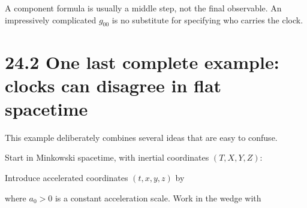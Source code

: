 \documentclass[
  11pt,
  letterpaper,
  oneside,
  openany]{scrbook}
\begin{document}
\endgroup

A component formula is usually a middle step, not the final observable.
An impressively complicated \(g_{00}\) is no substitute for specifying
who carries the clock.

\hypertarget{one-last-complete-example-clocks-can-disagree-in-flat-spacetime}{%
\section{24.2 One last complete example: clocks can disagree in flat
spacetime}\label{one-last-complete-example-clocks-can-disagree-in-flat-spacetime}}

This example deliberately combines several ideas that are easy to
confuse.

Start in Minkowski spacetime, with inertial coordinates \((T,X,Y,Z)\):

\begin{center}
\begingroup
{}
\ifdim\wd\grmathbox>\linewidth
\resizebox{\linewidth}{!}{\usebox{\grmathbox}}
\else\usebox{\grmathbox}\fi
\endgroup
\end{center}

Introduce accelerated coordinates \((t,x,y,z)\) by

\begin{center}
\begingroup
{}
\ifdim\wd\grmathbox>\linewidth
\resizebox{\linewidth}{!}{\usebox{\grmathbox}}
\else\usebox{\grmathbox}\fi
\endgroup
\end{center}

\begin{center}
\begingroup
{}
\ifdim\wd\grmathbox>\linewidth
\resizebox{\linewidth}{!}{\usebox{\grmathbox}}
\else\usebox{\grmathbox}\fi
\endgroup
\end{center}

where \(a_0>0\) is a constant acceleration scale. Work in the wedge with

\begin{center}
\begingroup
{}
\ifdim\wd\grmathbox>\linewidth
\resizebox{\linewidth}{!}{\usebox{\grmathbox}}
\else\usebox{\grmathbox}\fi
\endgroup
\end{center}
\end{document}
